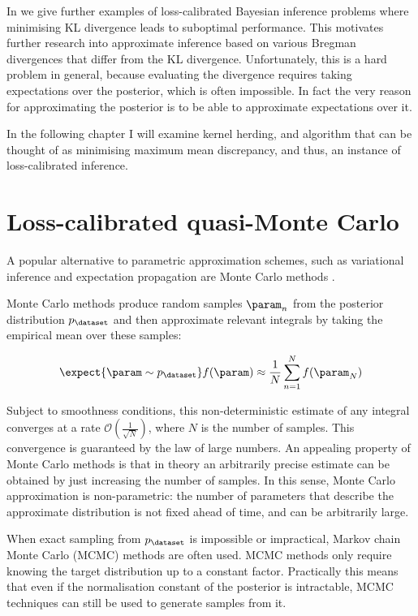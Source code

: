 In \citep{Lacoste2011} we give further examples of loss-calibrated Bayesian inference problems where minimising KL divergence leads to suboptimal performance. This motivates further research into approximate inference based on various Bregman divergences that differ from the KL divergence. Unfortunately, this is a hard problem in general, because evaluating the divergence requires taking expectations over the posterior, which is often impossible. In fact the very reason for approximating the posterior is to be able to approximate expectations over it.

In the following chapter I will examine kernel herding, and algorithm that can be thought of as minimising maximum mean discrepancy, and thus, an instance of loss-calibrated inference.

\section{Loss-calibrated quasi-Monte Carlo}

A popular alternative to parametric approximation schemes, such as variational inference and expectation propagation are Monte Carlo methods \citep[see \eg][]{Murray2007}.

Monte Carlo methods produce random samples $\param_n$ from the posterior distribution $p_\dataset$ and then approximate relevant integrals by taking the empirical mean over these samples:

\begin{equation}
	\expect{\param \sim p_{\dataset}} f(\param) \approx \frac{1}{N} \sum_{n = 1}^{N} f(\param_N)
\end{equation}

Subject to smoothness conditions, this non-deterministic estimate of any integral converges at a rate $\mathcal{O}(\frac{1}{\sqrt{N}})$, where $N$ is the number of samples. This convergence is guaranteed by the law of large numbers. An appealing property of Monte Carlo methods is that in theory an arbitrarily precise estimate can be obtained by just increasing the number of samples. In this sense, Monte Carlo approximation is non-parametric: the number of parameters that describe the approximate distribution is not fixed ahead of time, and can be arbitrarily large.

When exact sampling from $p_\dataset$ is impossible or impractical, Markov chain Monte Carlo (MCMC) methods are often used. MCMC methods only require knowing the target distribution up to a constant factor. Practically this means that even if the normalisation constant of the posterior is intractable, MCMC techniques can still be used to generate samples from it.

